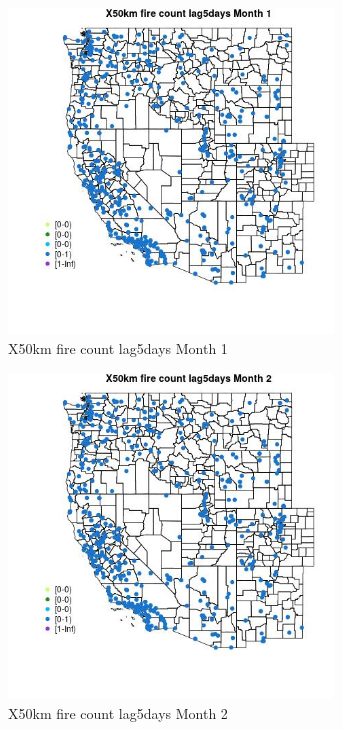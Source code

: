 \begin{figure} 
\centering  
\includegraphics[width=0.77\textwidth]{Code_Outputs/Report_ML_input_PM25_Step4_part_e_de_duplicated_aves_compiled_2019-05-14wNAs_MapObsMo1X50km_fire_count_lag5days.jpg} 
\caption{\label{fig:Report_ML_input_PM25_Step4_part_e_de_duplicated_aves_compiled_2019-05-14wNAsMapObsMo1X50km_fire_count_lag5days}X50km fire count lag5days Month 1} 
\end{figure} 
 

\begin{figure} 
\centering  
\includegraphics[width=0.77\textwidth]{Code_Outputs/Report_ML_input_PM25_Step4_part_e_de_duplicated_aves_compiled_2019-05-14wNAs_MapObsMo2X50km_fire_count_lag5days.jpg} 
\caption{\label{fig:Report_ML_input_PM25_Step4_part_e_de_duplicated_aves_compiled_2019-05-14wNAsMapObsMo2X50km_fire_count_lag5days}X50km fire count lag5days Month 2} 
\end{figure} 
 

